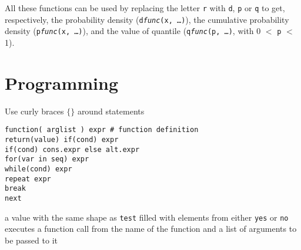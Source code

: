 All these functions can be used by replacing the letter {\tt r} with
{\tt d}, {\tt p} or {\tt q} to get, respectively, the probability
density ({\tt d{\it func}(x, \ldots)}), the cumulative probability
density ({\tt p{\it func}(x, \ldots)}), and the value of quantile
({\tt q{\it func}(p, \ldots)}, with 0 $<$ {\tt p} $<$ 1).

\section{Programming}{ Use curly braces $\lbrace\rbrace$ around statements }

{\tt function( arglist ) expr \# function definition\\ return(value) if(cond)
    expr\\ if(cond) cons.expr else  alt.expr\\ for(var in seq) expr\\
    while(cond) expr\\ repeat expr\\ break\\ next\\ }


	{a value with the same shape as {\tt test} filled with elements from either {\tt yes} or {\tt no}}
	{executes a function call from the name of the function and a list of arguments to be passed to it}

